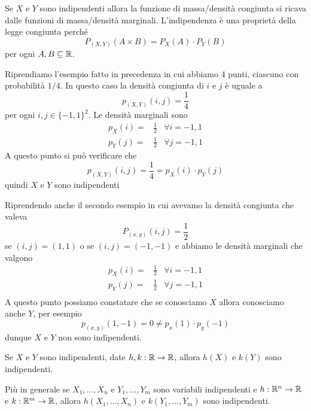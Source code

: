 \begin{observation}
	Se $X$ e $Y$ sono indipendenti allora la funzione di massa/densità congiunta si ricava dalle
	funzioni di massa/densità marginali. L'indipendenza è una proprietà della legge congiunta
	perché
	\[ P_{(X,Y)} (A \times B) = P_X(A) \cdot P_Y(B) \]
	per ogni $A, B \subseteq \mathbb{R}$.
\end{observation}

\begin{example}
	Riprendiamo l'esempio fatto in precedenza in cui abbiamo 4 punti, ciascuno con probabilità
	$1/4$. In questo caso la densità congiunta di $i$ e $j$ è uguale a
	\[ p_{(X,Y)} (i,j) = \frac{1}{4} \]
	per ogni $i,j \in \{ -1, 1 \}^2$. Le densità marginali sono
	\begin{align*}
		p_X(i) = & \frac{1}{2} & \forall i = -1, 1 \\
		p_Y(j) = & \frac{1}{2} & \forall j = -1, 1
	\end{align*}
	A questo punto si può verificare che
	\[ p_{(X,Y)} (i,j) = \frac{1}{4} = p_X(i) \cdot p_Y(j) \]
	quindi $X$ e $Y$ sono indipendenti
\end{example}

\begin{example}
	Riprendendo anche il secondo esempio in cui avevamo la densità congiunta che valeva
	\[ P_{(x,y)} (i,j) = \frac{1}{2} \]
	se $(i,j) = (1,1)$ o se $(i,j) = (-1,-1)$ e abbiamo le densità marginali che valgono
	\begin{align*}
		p_X(i) = & \frac{1}{2} & \forall i = -1, 1 \\
		p_Y(j) = & \frac{1}{2} & \forall j = -1, 1 \\
	\end{align*}
	A questo punto possiamo constatare che se conosciamo $X$ allora conosciamo anche $Y$, per
	esempio
	\[ p_{(x,y)} (1,-1) = 0 \neq p_x(1) \cdot p_y(-1) \]
	dunque $X$ e $Y$ non sono indipendenti.
\end{example}

\begin{proposition}
	Se $X$ e $Y$ sono indipendenti, date $h, k : \mathbb{R} \to \mathbb{R}$, allora $h(X)$ e $k(Y)$ sono
	indipendenti.

	Più in generale se $X_1, \dots, X_n$ e $Y_1, \dots, Y_m$ sono variabili indipendenti e
	$h : \mathbb{R}^n \to \mathbb{R}$ e $k : \mathbb{R}^m \to \mathbb{R}$, allora $h(X_1, \dots, X_n)$ e $k(Y_1, \dots, Y_m)$ sono
	indipendenti.
\end{proposition}

